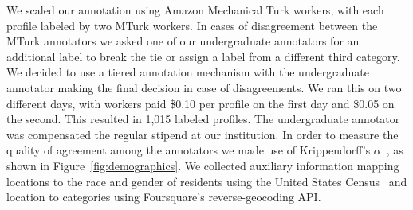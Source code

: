 We scaled our annotation using Amazon Mechanical Turk workers, with each profile labeled by two MTurk workers.
In cases of disagreement between the MTurk annotators we asked one of our undergraduate annotators for an additional label to break the tie or assign a label from a different third category. We decided to use a tiered annotation mechanism with the undergraduate annotator making the final decision in case of disagreements.
We ran this on two different days, with workers paid \$0.10 per profile on the first day and \$0.05 on the second.
This resulted in 1,015 labeled profiles.
The undergraduate annotator was compensated the regular stipend at our institution.
In order to measure the quality of agreement among the annotators we made use of Krippendorff's $\alpha$~\cite{Krippendorff}, as shown in Figure~\ref{fig:demographics}.
We collected auxiliary information mapping locations to the race and gender of residents using the United States Census~\cite{census:2010} and location to categories using Foursquare's reverse-geocoding API.


